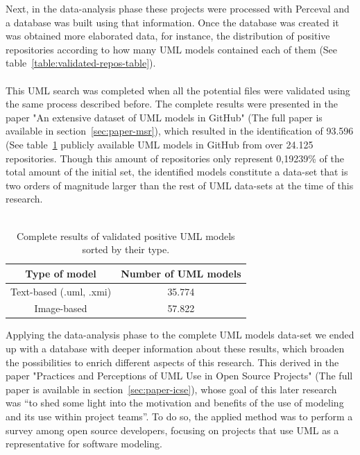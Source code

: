 \documentclass[a4paper, 12pt]{book}
\begin{document}
Next, in the data-analysis phase these projects were processed with Perceval and a database was built using that information.
Once the database was created it was obtained more elaborated data, for instance, the distribution of positive repositories
according to how many UML models contained each of them (See table~\ref{table:validated-repos-table}).\\\\

This UML search was completed when all the potential files were validated using the same process described before.
The complete results were presented in the paper "An extensive dataset of UML models in GitHub" (The full paper is available in section~\ref{sec:paper-msr}),
which resulted in the identification of 93.596 (See table~\ref{table:validated-models-table} publicly available UML models
in GitHub from over 24.125 repositories. Though this amount of repositories only represent 0,19239\% of the total amount of the initial set,
the identified models constitute a data-set that is two orders of magnitude larger than the rest of UML data-sets at the time of this research.\\\\
\begin{table}[]
  \centering
  \caption{Complete results of validated positive UML models sorted by their type.}
  \label{table:validated-models-table}
  \begin{tabular}{|c|c|}
  \hline
  \textbf{Type of model}     & \textbf{Number of UML models}     \\ \hline
  Text-based (.uml, .xmi)    & 35.774                            \\
  Image-based                & 57.822                            \\ \hline
  \end{tabular}
\end{table}
Applying the data-analysis phase to the complete UML models data-set we ended up with a database with deeper information about these results,
which broaden the possibilities to enrich different aspects of this research. This derived in the paper "Practices and Perceptions of UML Use
in Open Source Projects" (The full paper is available in section~\ref{sec:paper-icse}), whose goal of this later research was ``to shed some
light into the motivation and benefits of the use of modeling and its use within project teams''. To do so, the applied method was to
perform a survey among open source developers, focusing on projects that use UML as a representative for software modeling.\\
\end{document}
